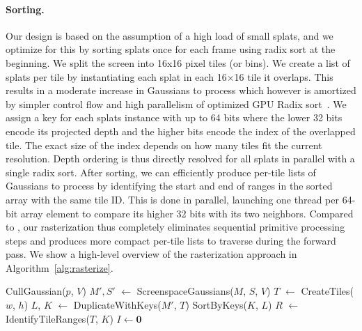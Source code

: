 \begin{appendix}
	\paragraph{Sorting.}
	Our design is based on the assumption of a high load of small splats, and we optimize for this by sorting splats once for each frame using radix sort at the beginning.
	We split the screen into 16x16 pixel tiles (or bins).  We create a list of splats per tile by instantiating each splat in each 16$\times$16 tile it overlaps. This results in a moderate increase in Gaussians to process
	which however is amortized by simpler control flow and high parallelism of optimized GPU Radix sort~\cite{merrill2010revisiting}.
	We assign a key for each splats instance with up to 64 bits where the lower 32 bits encode its projected depth and the higher bits encode the index of the overlapped tile. The exact size of the index depends on how many tiles fit the current resolution. Depth ordering is thus directly resolved for all splats in parallel with a single radix sort. After sorting, we can efficiently produce per-tile lists of Gaussians to process by identifying the start and end of ranges in the sorted array with the same tile ID. This is done in parallel, launching one thread per 64-bit array element to compare its higher 32 bits with its two neighbors.
	Compared to \cite{Lassner_2021_CVPR}, our rasterization thus completely eliminates sequential primitive processing steps and produces more compact per-tile lists to traverse during the forward pass.
	We show a high-level overview of the rasterization approach in Algorithm~\ref{alg:rasterize}.

	\begin{algorithm}
		\caption{GPU software rasterization of 3D Gaussians\\
			$w$, $h$: width and height of the image to rasterize\\
			$M$, $S$: Gaussian means and covariances in world space\\
			$C$, $A$: Gaussian colors and opacities\\
			$V$: view configuration of current camera}
		\label{alg:rasterize}
		\begin{algorithmic}



			\State CullGaussian($p$, $V$) 
			\State $M', S'$ $\gets$ ScreenspaceGaussians($M$, $S$, $V$) 
			\State $T$ $\gets$ CreateTiles($w$, $h$)
			\State $L$, $K$ $\gets$ DuplicateWithKeys($M'$, $T$) 
			\State SortByKeys($K$, $L$)							
			\State $R$ $\gets$ IdentifyTileRanges($T$, $K$)
			\State $I \gets \mathbf{0}$ 


\end{algorithmic}
\end{algorithm}
\end{appendix}
